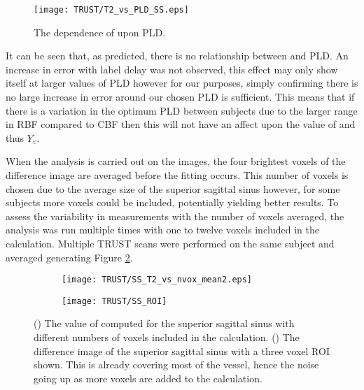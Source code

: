 \begin{figure}[H]
	\centering
	\texttt{[image: TRUST/T2\_vs\_PLD\_SS.eps]}
	\caption{The dependence of \ttwo upon \ac{PLD}.}
	\label{fig:SS_T2vsPLD}	
\end{figure}


It can be seen that, as predicted, there is no relationship between \ttwo and \ac{PLD}. An increase in error with label delay was not observed, this effect may only show itself at larger values of \ac{PLD} however for our purposes, simply confirming there is no large increase in error around our chosen \ac{PLD} is sufficient. This means that if there is a variation in the optimum \ac{PLD} between subjects due to the larger range in \ac{RBF} compared to \ac{CBF} then this will not have an affect upon the value of \ttwo and thus $Y_v$.

When the analysis is carried out on the images, the four brightest voxels of the difference image are averaged before the fitting occurs. This number of voxels is chosen due to the average size of the superior sagittal sinus however, for some subjects more voxels could be included, potentially yielding better results. To assess the variability in \ttwo measurements with the number of voxels averaged, the analysis was run multiple times with one to twelve voxels included in the calculation. Multiple \ac{TRUST} scans were performed on the same subject and averaged generating Figure \ref{fig:nvox_SS}.

\begin{figure}[H]
	\centering
	\begin{subfigure}[c]{0.47\textwidth}
		\centering
		\texttt{[image: TRUST/SS\_T2\_vs\_nvox\_mean2.eps]}
		\caption{}
		\label{fig:nvox_SS}
	\end{subfigure}
	\hfill
	\begin{subfigure}[c]{0.47\textwidth}
		\centering
		\texttt{[image: TRUST/SS\_ROI]}
		\caption{}
		\label{fig:SS_ROI}
	\end{subfigure}
	\caption{() The value of \ttwo computed for the superior sagittal sinus with different numbers of voxels included in the calculation. () The difference image of the superior sagittal sinus with a three voxel \ac{ROI} shown. This is already covering most of the vessel, hence the noise going up as more voxels are added to the calculation.}
	\label{fig:nv_SS}
\end{figure}

